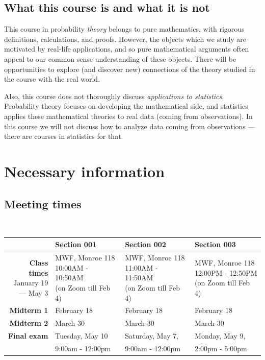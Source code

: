 \documentclass[oneside,11pt]{amsart}
\begin{document}
\subsection*{What this course is and what it is not}

This course in probability \emph{theory} belongs to pure mathematics, with
rigorous definitions, calculations, and proofs. However, the objects which we
study are motivated by real-life applications, and so pure mathematical
arguments often appeal to our common sense understanding of these objects.
There will be opportunities to explore (and discover new) connections of the
theory studied in the course with the real world.

Also, this course does not thoroughly discuss \emph{applications to statistics}.
Probability
theory focuses on developing the mathematical side, and statistics applies
these mathematical theories to real data (coming from observations). In this
course we will not discuss how to analyze data coming from observations ---
there are courses in statistics for that.

\section{Necessary information}
\label{sec:necc}

\subsection{Meeting times}{\ }\\
\label{sub:meeting_times}

\begin{tabular}{|r|l|l|l|}
	\hline
	&Section 001
	&Section 002
	&Section 003
	\\
	\hline
	\rule{0pt}{34pt}
	\parbox{.2\textwidth}{\textbf{Class times}\\
	January 19\\\qquad  --- May 3}
	& \parbox{.22\textwidth}{MWF, Monroe 118\\ 10:00AM - 10:50AM\\ (on Zoom till Feb 4)}
	& \parbox{.22\textwidth}{MWF, Monroe 118\\ 11:00AM - 11:50AM\\ (on Zoom till Feb 4)}
	& \parbox{.22\textwidth}{MWF, Monroe 118\\ 12:00PM - 12:50PM\\ (on Zoom till Feb 4)}
	\\[8pt] \hline
	\textbf{Midterm 1}   
	& February 18
	& February 18
	& February 18
	 \\ \hline
	 \textbf{Midterm 2}   
	 & March 30
	 & March 30
	 & March 30
	 \\ \hline
	 \textbf{Final exam}     
		& Tuesday, May 10
		& Saturday, May 7, 
		& Monday, May 9, 
	 \\ 
		&9:00am - 12:00pm
		&9:00am - 12:00pm
		&2:00pm - 5:00pm
	 \\ \hline
\end{tabular}
\end{document}
